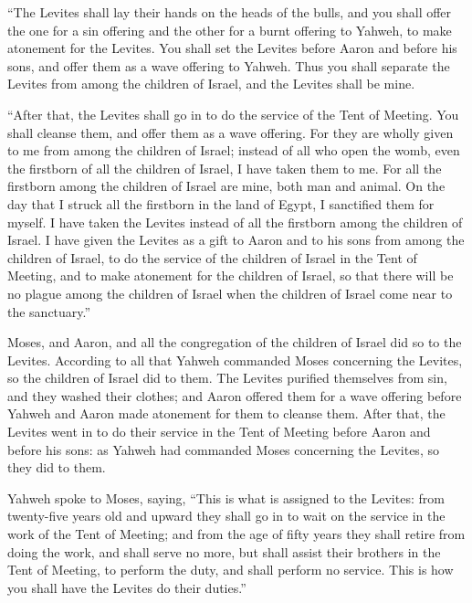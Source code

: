  ``The Levites shall lay their hands on the heads of the
bulls, and you shall offer the one for a sin offering and the other for
a burnt offering to Yahweh, to make atonement for the Levites.
 You shall set the Levites before Aaron and before his
sons, and offer them as a wave offering to Yahweh.  Thus
you shall separate the Levites from among the children of Israel, and
the Levites shall be mine.

 ``After that, the Levites shall go in to do the service of
the Tent of Meeting. You shall cleanse them, and offer them as a wave
offering.  For they are wholly given to me from among the
children of Israel; instead of all who open the womb, even the firstborn
of all the children of Israel, I have taken them to me. 
For all the firstborn among the children of Israel are mine, both man
and animal. On the day that I struck all the firstborn in the land of
Egypt, I sanctified them for myself.  I have taken the
Levites instead of all the firstborn among the children of Israel.
 I have given the Levites as a gift to Aaron and to his
sons from among the children of Israel, to do the service of the
children of Israel in the Tent of Meeting, and to make atonement for the
children of Israel, so that there will be no plague among the children
of Israel when the children of Israel come near to the sanctuary.''

 Moses, and Aaron, and all the congregation of the children
of Israel did so to the Levites. According to all that Yahweh commanded
Moses concerning the Levites, so the children of Israel did to them.
 The Levites purified themselves from sin, and they washed
their clothes; and Aaron offered them for a wave offering before Yahweh
and Aaron made atonement for them to cleanse them.  After
that, the Levites went in to do their service in the Tent of Meeting
before Aaron and before his sons: as Yahweh had commanded Moses
concerning the Levites, so they did to them.

 Yahweh spoke to Moses, saying,  ``This is
what is assigned to the Levites: from twenty-five years old and upward
they shall go in to wait on the service in the work of the Tent of
Meeting;  and from the age of fifty years they shall retire
from doing the work, and shall serve no more,  but shall
assist their brothers in the Tent of Meeting, to perform the duty, and
shall perform no service. This is how you shall have the Levites do
their duties.''

